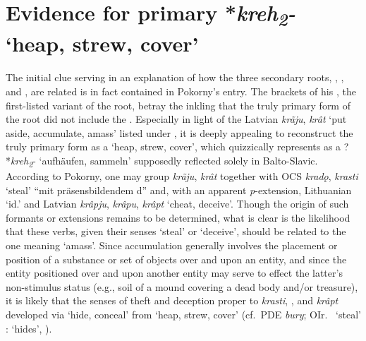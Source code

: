 \documentclass[output=paper,colorlinks,citecolor=brown]{langscibook}
\begin{document}
\section{Evidence for primary *\textit{kreh\textsubscript{2}-} ‘heap, strew, cover’}
\largerpage
The initial clue serving in an explanation of how the three secondary roots, , , and , are related is in fact contained in Pokorny’s entry. The brackets of his , the first-listed variant of the root, betray the inkling that the truly primary form of the root did not include the . Especially in light of the Latvian \textit{krãju}, \textit{krât} ‘put aside, accumulate, amass’ listed under , it is deeply appealing to reconstruct the truly primary form  as a  ‘heap, strew, cover’, which  quizzically represents as a  ?*\textit{kreh\textsubscript{2}}- ‘aufhäufen, sammeln’ supposedly reflected solely in Balto-Slavic. According to Pokorny, one may group \textit{krãju}, \textit{krât} together with OCS \textit{kradǫ}, \textit{krasti} ‘steal’ “mit präsensbildendem d” and, with an apparent \textit{p}-extension, Lithuanian  ‘id.’ and Latvian \textit{krâpju}, \textit{krâpu}, \textit{krâpt} ‘cheat, deceive’. Though the origin of such formants or extensions remains to be determined, what is clear is the likelihood that these verbs, given their senses ‘steal’ or ‘deceive’, should be related to the one meaning ‘amass’. Since accumulation generally involves the placement or position of a substance or set of objects over and upon an entity, and since the entity positioned over and upon another entity may serve to effect the latter’s non-stimulus status (e.g., soil of a mound covering a dead body and/or treasure), it is likely that the senses of theft and deception proper to \textit{krasti}, , and \textit{krâpt} developed via ‘hide, conceal’ from ‘heap, strew, cover’ (cf.\ PDE \textit{bury}; OIr.\  ‘steal’ :  ‘hides’, \citealt[791]{Buck1949}). 
\end{document}
